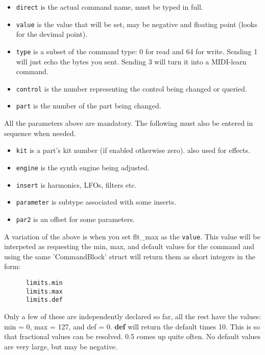    \begin{itemize}
      \item \texttt{direct} is the actual command name, must be typed in full.
      \item \texttt{value} is the value that will be set, may be negative and
         floating point (looks for the devimal point).
      \item \texttt{type} is a subset of the command type: 0 for read and 64 for
         write. Sending 1 will just echo the bytes you sent.  Sending 3 will
         turn it into a MIDI-learn command.
      \item \texttt{control} is the number representing the control being
         changed or queried.
      \item \texttt{part} is the number of the part being changed.
   \end{itemize}

   All the parameters above are mandatory. The following must also be entered in
   sequence when needed.

   \begin{itemize}
      \item \texttt{kit} is a part's kit number (if enabled otherwise zero).
         also used for effects.
      \item \texttt{engine} is the synth engine being adjusted.
      \item \texttt{insert} is harmonics, LFOs, filters etc.
      \item \texttt{parameter} is subtype associated with some inserts.
      \item \texttt{par2} is an offset for some parameters.
   \end{itemize}

   A variation of the above is when you set flt\_max as the \texttt{value}.
   This value will
   be interpeted as requesting the min, max, and default values for the
   command and using the same 'CommandBlock' struct will return them as short
   integers in the form:

   \begin{verbatim}
      limits.min
      limits.max
      limits.def
   \end{verbatim}

   Only a few of these are independently declared so far, all the rest have the
   values: min = 0, max = 127, and def = 0.  \textbf{def} will return the
   default times 10. This is so that fractional values can be resolved. 0.5 comes
   up quite often. No default values are very large, but may be negative.

